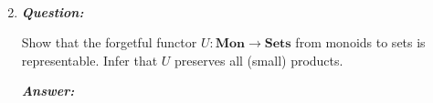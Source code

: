 \documentclass{article}
\begin{document}
\begin{enumerate}
	      \begin{align*}
	      \end{align*}


	\item
	      \textbf{\textit{Question:}}

	      Show that the forgetful functor $ U : \textbf{Mon} \to \textbf{Sets}  $ from monoids to sets is representable. Infer that $ U $ preserves all (small) products.

	      \textbf{\textit{Answer:}}

	      \begin{align*}
	      \end{align*}

\end{enumerate}
\end{document}
